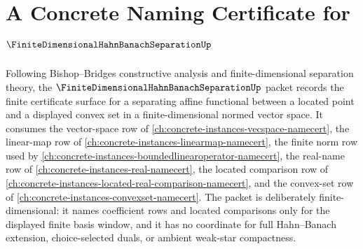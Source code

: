 \chapter{A Concrete Naming Certificate for $\FiniteDimensionalHahnBanachSeparationUp$}
\label{ch:concrete-instances-finite-dimensional-hahn-banach-separation-namecert}

Following Bishop--Bridges constructive analysis and finite-dimensional separation theory, the $\FiniteDimensionalHahnBanachSeparationUp$ packet records the finite certificate surface for a separating affine functional between a located point and a displayed convex set in a finite-dimensional normed vector space. It consumes the vector-space row of \autoref{ch:concrete-instances-vecspace-namecert}, the linear-map row of \autoref{ch:concrete-instances-linearmap-namecert}, the finite norm row used by \autoref{ch:concrete-instances-boundedlinearoperator-namecert}, the real-name row of \autoref{ch:concrete-instances-real-namecert}, the located comparison row of \autoref{ch:concrete-instances-located-real-comparison-namecert}, and the convex-set row of \autoref{ch:concrete-instances-convexset-namecert}. The packet is deliberately finite-dimensional: it names coefficient rows and located comparisons only for the displayed finite basis window, and it has no coordinate for full Hahn--Banach extension, choice-selected duals, or ambient weak-star compactness.

